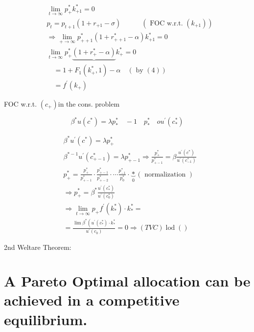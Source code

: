 \documentclass[10pt]{article}
\begin{document}
$$
\begin{aligned}
& \lim _{t \rightarrow \infty} p_{+}^{*} k_{+1}^{*}=0 \\
& p_{t}=p_{t+1}\left(1+r_{+1}-\sigma\right) \quad \quad \quad\left(\text { FOC w.r.t. }\left(k_{+1}\right)\right) \\
& \Rightarrow \lim _{+\rightarrow \infty} p_{++1}^{*}\left(1+r_{++1}^{*}-\alpha\right) k_{+1}^{*}=0 \\
& \lim _{t \rightarrow \infty} p_{+}^{*} \underbrace{\left(1+r_{+}^{*}-\alpha\right)} k_{+}^{*}=0 \\
& \quad=1+F_{1}\left(k_{+}^{*}, 1\right)-\alpha \quad(\text { by }(4)) \\
& \quad=f^{\prime}\left(k_{+}\right)
\end{aligned}
$$

FOC w.r.t. $\left(c_{+}\right)$in the cons. problem

$$
\beta^{*} u\left(c^{*}\right)=\lambda p_{*}^{*} \quad-1 \quad p_{*}^{*} \quad o u^{\prime}\left(c_{*}^{*}\right)
$$

$$
\begin{aligned}
& \beta^{*} u^{\prime}\left(c^{*}\right)=\lambda p_{+}^{*} \\
& \beta^{*-1} u^{\prime}\left(c_{+-1}^{*}\right)=\lambda p_{+-1}^{*} \Rightarrow \frac{p_{+}^{*}}{p_{+-1}^{*}}=\beta \frac{u^{\prime}\left(c^{*}\right)}{u^{\prime}\left(c_{-1}^{*}\right)} \\
& p_{+}^{*}=\frac{p_{+}^{*}}{p_{+-1}^{*}} \cdot \frac{p_{+-1}^{*}}{p_{+-2}^{*}} \cdot \cdots \frac{p_{-1}^{*}}{p_{0}^{*}} \cdot \underbrace{*}_{0}(\text { normalization }) \\
& \Rightarrow p_{+}^{*}=\beta^{*} \frac{u^{\prime}\left(c_{*}^{*}\right)}{u^{\prime}\left(c_{0}^{*}\right)} \\
& \Rightarrow \lim _{t \rightarrow \infty} p_{+} f^{\prime}\left(k_{*}^{*}\right) \cdot k_{*}^{*}= \\
& =\frac{\lim \beta^{*}\left(u^{\prime}\left(c_{*}^{*}\right) \cdot k_{*}^{*}\right.}{u^{\prime}\left(c_{0}\right)}=0 \Rightarrow(T V C) \operatorname{lod}()
\end{aligned}
$$

2nd Weltare Theorem:

\section*{A Pareto Optimal allocation can be achieved in a competitive equilibrium.}
\end{document}
